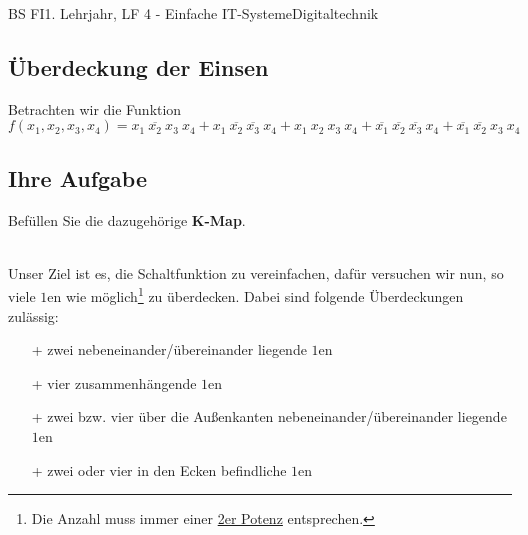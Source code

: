 \documentclass[11pt,twocolumn,oneside,openany,headings=optiontotoc,11pt,numbers=noenddot]{article}
\begin{document}
\begin{worksheet}{BS FI}{1. Lehrjahr, LF 4 - Einfache IT-Systeme}{Digitaltechnik}
		\subsection{Überdeckung der Einsen} Betrachten wir die Funktion\\
		\(f(x_1,x_2,x_3,x_4) = x_1\ \overline{x_2}\ x_3\ x_4 + x_1\ \overline{x_2}\ \overline{x_3}\ x_4 + x_1\ x_2\ x_3\ x_4 + \overline{x_1}\ \overline{x_2}\ \overline{x_3}\ x_4 + \overline{x_1}\ \overline{x_2}\ x_3\ x_4\)
		\subsection*{Ihre Aufgabe} Befüllen Sie die dazugehörige \textbf{K-Map}.
		\begin{karnaugh-map}[4][4][1][$x_3x_4$][$x_1x_2$]
			
		\end{karnaugh-map}\\
		Unser Ziel ist es, die Schaltfunktion zu vereinfachen, dafür versuchen wir nun, so viele \(1\)en wie möglich\footnote{Die Anzahl muss immer einer \underline{2er Potenz} entsprechen.} zu überdecken. Dabei sind folgende Überdeckungen zulässig:
		\begin{itemize}
			\item[+] zwei nebeneinander/übereinander liegende \(1\)en
			\item[+] vier zusammenhängende \(1\)en
			\item[+] zwei bzw. vier über die Außenkanten nebeneinander/übereinander liegende \(1\)en
			\item[+] zwei oder vier in den Ecken befindliche \(1\)en
		\end{itemize}
		\begin{karnaugh-map}[4][4][1][$x_3x_4$][$x_1x_2$]
		\end{karnaugh-map}
		\begin{karnaugh-map}[4][4][1][$x_3x_4$][$x_1x_2$]
		\end{karnaugh-map}
		\begin{karnaugh-map}[4][4][1][$x_3x_4$][$x_1x_2$]
		\end{karnaugh-map}
		\begin{karnaugh-map}[4][4][1][$x_3x_4$][$x_1x_2$]
			\implicantcorner
		\end{karnaugh-map}

\end{worksheet}
\end{document}
